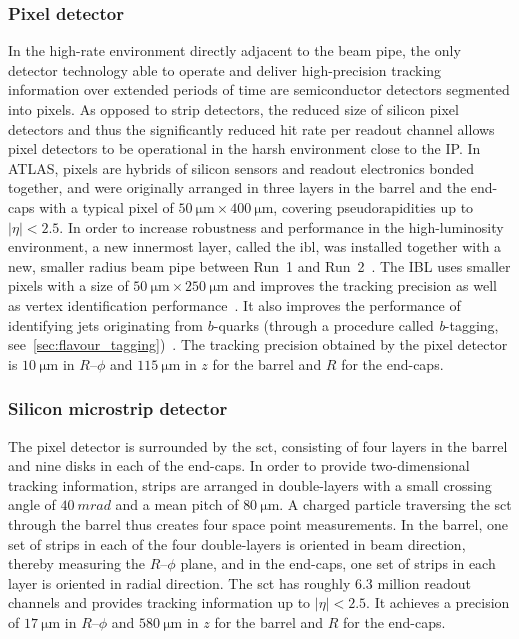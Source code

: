 \subsubsection{Pixel detector}

In the high-rate environment directly adjacent to the beam pipe, the only detector technology able to operate and deliver high-precision tracking information over extended periods of time are semiconductor detectors segmented into pixels. As opposed to strip detectors, the reduced size of silicon pixel detectors and thus the significantly reduced hit rate per readout channel allows pixel detectors to be operational in the harsh environment close to the IP. In ATLAS, pixels are hybrids of silicon sensors and readout electronics bonded together, and were originally arranged in three layers in the barrel and the end-caps with a typical pixel of $\SI{50}{\micro\meter}\times \SI{400}{\micro\meter}$, covering pseudorapidities up to $\vert\eta\vert < 2.5$. In order to increase robustness and performance in the high-luminosity environment, a new innermost layer, called the \gls{ibl}, was installed together with a new, smaller radius beam pipe between Run~1 and Run~2~\cite{Abbott:2018ikt,Capeans:1291633}. The IBL uses smaller pixels with a size of $\SI{50}{\micro\meter}\times \SI{250}{\micro\meter}$ and improves the tracking precision as well as vertex identification performance~\cite{Capeans:1291633}. It also improves the performance of identifying jets originating from $b$-quarks (through a procedure called \textit{b}-tagging, see~\cref{sec:flavour_tagging})~\cite{Aad:2019aic}. The tracking precision obtained by the pixel detector is $\SI{10}{\micro\meter}$ in $R$--$\phi$ and $\SI{115}{\micro\meter}$ in $z$ for the barrel and $R$ for the end-caps.

\subsubsection{Silicon microstrip detector}

The pixel detector is surrounded by the \gls{sct}, consisting of four layers in the barrel and nine disks in each of the end-caps. In order to provide two-dimensional tracking information, strips are arranged in double-layers with a small crossing angle of $\SI{40}{mrad}$ and a mean pitch of $\SI{80}{\micro\meter}$. A charged particle traversing the \gls{sct} through the barrel thus creates four space point measurements. In the barrel, one set of strips in each of the four double-layers is oriented in beam direction, thereby measuring the $R$--$\phi$ plane, and in the end-caps, one set of strips in each layer is oriented in radial direction. The \gls{sct} has roughly $6.3$ million readout channels and provides tracking information up to $\vert\eta\vert <2.5$. It achieves a precision of $\SI{17}{\micro\meter}$ in $R$--$\phi$ and $\SI{580}{\micro\meter}$ in $z$ for the barrel and $R$ for the end-caps.

